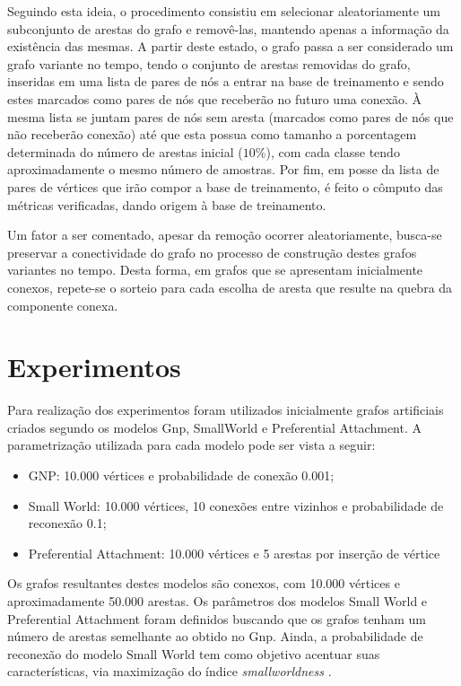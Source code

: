 \documentclass[a4paper,11pt]{article}
\begin{document}
Seguindo esta ideia, o procedimento consistiu em selecionar aleatoriamente um subconjunto de arestas do grafo e removê-las, mantendo apenas a informação da existência das mesmas. A partir deste estado, o grafo passa a ser considerado um grafo variante no tempo, tendo o conjunto de arestas removidas do grafo, inseridas em uma lista de pares de nós a entrar na base de treinamento e sendo estes marcados como pares de nós que receberão no futuro uma conexão. 
À mesma lista se juntam pares de nós sem aresta (marcados como pares de nós que não receberão conexão) até que esta possua como tamanho a porcentagem determinada do número de arestas inicial ($10\%$), com cada classe tendo aproximadamente o mesmo número de amostras.
Por fim, em posse da lista de pares de vértices que irão compor a base de treinamento, é feito o cômputo das métricas verificadas, dando origem à base de treinamento.

Um fator a ser comentado, apesar da remoção ocorrer aleatoriamente, busca-se preservar a conectividade do grafo no processo de construção destes grafos variantes no tempo. Desta forma, em grafos que se apresentam inicialmente conexos, repete-se o sorteio para cada escolha de aresta que resulte na quebra da componente conexa.



\vspace{0.5cm}

\section{Experimentos}

\vspace{0.5cm}


Para realização dos experimentos foram utilizados inicialmente grafos artificiais criados segundo os modelos Gnp, SmallWorld e Preferential Attachment. A parametrização utilizada para cada modelo pode ser vista a seguir:

\begin{itemize}
	\item GNP: 10.000 vértices e probabilidade de conexão 0.001;
	\item Small World: 10.000 vértices, 10 conexões entre vizinhos e probabilidade de reconexão 0.1;
	\item Preferential Attachment: 10.000 vértices e 5 arestas por inserção de vértice
\end{itemize}

Os grafos resultantes destes modelos são conexos, com 10.000 vértices e aproximadamente 50.000 arestas. Os parâmetros dos modelos Small World e Preferential Attachment foram definidos buscando que os grafos tenham um número de arestas semelhante ao obtido no Gnp. Ainda, a probabilidade de reconexão do modelo Small World tem como objetivo acentuar suas características, via maximização do índice \textit{smallworldness} \cite{Humphries08}. 
\end{document}
